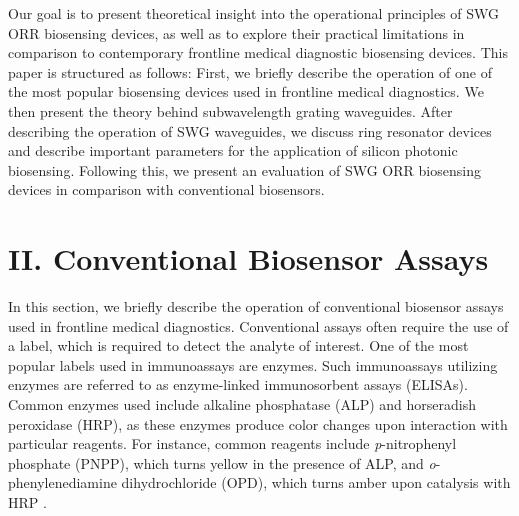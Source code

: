 \documentclass[aps,prl,twocolumn, superscriptaddress,nobalancelastpage]{revtex4}
\begin{document}
Our goal is to present theoretical insight into the operational principles of SWG ORR biosensing devices, as well as to explore their practical limitations in comparison to contemporary frontline medical diagnostic biosensing devices. This paper is structured as follows: First, we briefly describe the operation of one of the most popular biosensing devices used in frontline medical diagnostics. We then present the theory behind subwavelength grating waveguides. After describing the operation of SWG waveguides, we discuss ring resonator devices and describe important parameters for the application of silicon photonic biosensing. Following this, we present an evaluation of SWG ORR biosensing devices in comparison with conventional biosensors.

\vspace{-1em}
\section{II. Conventional Biosensor Assays}
\vspace{-1em}

In this section, we briefly describe the operation of conventional biosensor assays used in frontline medical diagnostics. Conventional assays often require the use of a label, which is required to detect the analyte of interest. One of the most popular labels used in immunoassays are enzymes. Such immunoassays utilizing enzymes are referred to as enzyme-linked immunosorbent assays (ELISAs). Common enzymes used include alkaline phosphatase (ALP) and horseradish peroxidase (HRP), as these enzymes produce color changes upon interaction with particular reagents. For instance, common reagents include \textit{p}-nitrophenyl phosphate (PNPP), which turns yellow in the presence of ALP, and \textit{o}-phenylenediamine dihydrochloride (OPD),  which turns amber upon catalysis with HRP \cite{thermofisher}. 
\end{document}
